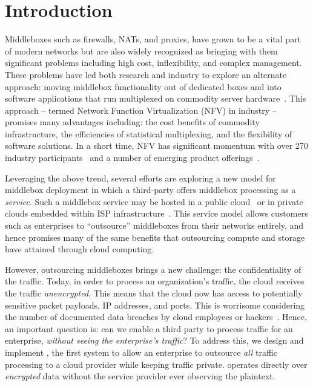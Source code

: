 \section{Introduction}\label{sec:intro}

Middleboxes such as firewalls, NATs, and proxies, have grown to be a vital part of modern networks but are 
also widely recognized as bringing  with them significant problems including high cost, inflexibility, and complex management.  
These problems have led both research and industry to explore an alternate approach: moving middlebox functionality out of dedicated boxes and into 
software applications that run multiplexed on commodity server hardware~\cite{mb-manifesto,comb,aplomb,opennf,clickos,flowtags,nfv,domain20,opnfv}.
This approach -- termed Network Function Virtualization (NFV) in industry -- promises many advantages including: the cost benefits of commodity infrastructure, 
the efficiencies of statistical multiplexing, and the flexibility of software solutions. 
In a short time, NFV has significant momentum with over 270 industry participants~\cite{etsi-nfv} and a number of emerging product offerings~\cite{brocade,dell,juniper}.

Leveraging the above trend, several efforts are exploring a new model for middlebox deployment in which a third-party offers middlebox processing as a  
\emph{service}.
Such a middlebox service may be hosted in a public cloud~\cite{aplomb,zscalar,aryaka} or in private clouds embedded within ISP 
infrastructure~\cite{domain20, telefonica}.  
This service model allows customers such as enterprises to ``outsource'' middleboxes from their networks entirely, and hence promises many of the same 
benefits that outsourcing compute and storage have attained through cloud computing.%

However, outsourcing middleboxes brings a new challenge: the confidentiality of the traffic. 
Today, in order to process an organization's traffic, the cloud receives the traffic {\em unencrypted}.  This means that the cloud 
now has access to potentially sensitive packet payloads,  IP addresses, and ports. This is 
worrisome considering the number of documented data breaches by cloud employees or hackers~\cite{PrivacyRecords}.
Hence, an important question is: can we enable a third party to process traffic for an enterprise, {\em without seeing the enterprise's traffic}?
To address this, we design and implement \sys, the first system to allow an enterprise to outsource {\it all} traffic processing to a cloud provider while keeping traffic private. 
\sys operates directly over {\it encrypted} data without the service provider ever observing the plaintext.


